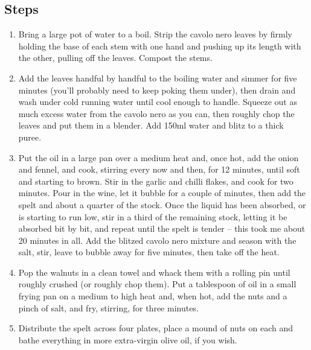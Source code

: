 \documentclass{book}
\begin{document}
\subsection*{Steps}
\begin{enumerate}
\item Bring a large pot of water to a boil. Strip the cavolo nero leaves by firmly holding the base of each stem with one hand and pushing up its length with the other, pulling off the leaves. Compost the stems.
\item Add the leaves handful by handful to the boiling water and simmer for five minutes (you’ll probably need to keep poking them under), then drain and wash under cold running water until cool enough to handle. Squeeze out as much excess water from the cavolo nero as you can, then roughly chop the leaves and put them in a blender. Add 150ml water and blitz to a thick puree.
\item Put the oil in a large pan over a medium heat and, once hot, add the onion and fennel, and cook, stirring every now and then, for 12 minutes, until soft and starting to brown. Stir in the garlic and chilli flakes, and cook for two minutes. Pour in the wine, let it bubble for a couple of minutes, then add the spelt and about a quarter of the stock. Once the liquid has been absorbed, or is starting to run low, stir in a third of the remaining stock, letting it be absorbed bit by bit, and repeat until the spelt is tender – this took me about 20 minutes in all. Add the blitzed cavolo nero mixture and season with the salt, stir, leave to bubble away for five minutes, then take off the heat.
\item Pop the walnuts in a clean towel and whack them with a rolling pin until roughly crushed (or roughly chop them). Put a tablespoon of oil in a small frying pan on a medium to high heat and, when hot, add the nuts and a pinch of salt, and fry, stirring, for three minutes.
\item Distribute the spelt across four plates, place a mound of nuts on each and bathe everything in more extra-virgin olive oil, if you wish.
\end{enumerate}
\newpage
\end{document}
